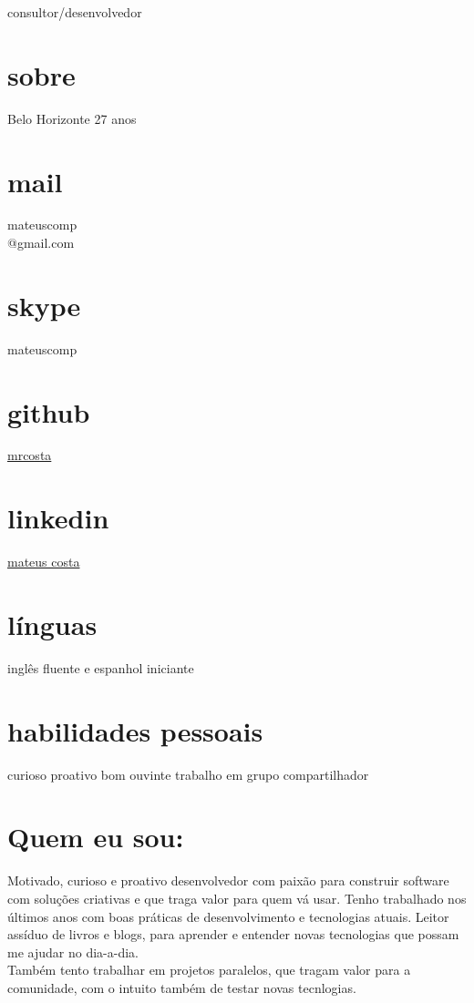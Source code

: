 \documentclass[]{friggeri-cv}
\begin{document}
       {consultor/desenvolvedor}

\begin{aside}
  \section{sobre}
    Belo Horizonte
    27 anos
  \section{mail}
    mateuscomp\\@gmail.com 
  \section{skype}
    mateuscomp
  \section{github}
    \href{https://github.com/mrcosta}{mrcosta}
  \section{linkedin}
    \href{www.linkedin.com/in/mateusrodriguescosta}{mateus costa}
  \section{línguas}
    inglês fluente e espanhol iniciante
  \section{habilidades pessoais}
  curioso
  proativo
  bom ouvinte
  trabalho em grupo
  compartilhador
\end{aside}

\section{Quem eu sou:}

Motivado, curioso e proativo desenvolvedor com paixão para construir software com soluções criativas e que traga valor para quem vá usar. Tenho trabalhado nos últimos anos com boas práticas de desenvolvimento e tecnologias atuais. Leitor assíduo de livros e blogs, para aprender e entender novas tecnologias que possam me ajudar no dia-a-dia.\\
    
    Também tento trabalhar em projetos paralelos, que tragam valor para a comunidade, com o intuito também de testar novas tecnlogias.
\end{document}
